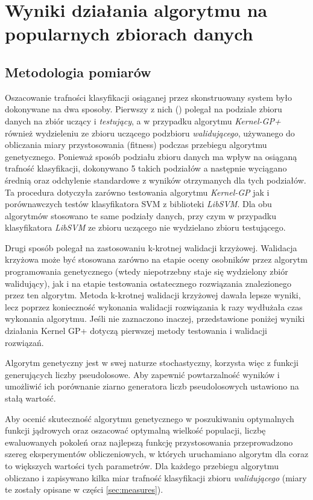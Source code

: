 
\chapter{Wyniki działania algorytmu na popularnych zbiorach danych}

\section{Metodologia pomiarów}
	Oszacowanie trafności klasyfikacji osiąganej przez skonstruowany system było dokonywane na dwa sposoby. Pierwszy z nich () polegał na podziale zbioru danych na zbiór uczący i \emph{testujący}, a w przypadku algorytmu \emph{Kernel-GP+} również wydzieleniu ze zbioru uczącego podzbioru \emph{walidującego}, używanego do obliczania miary przystosowania (fitness) podczas przebiegu algorytmu genetycznego. Ponieważ sposób podziału zbioru danych ma wpływ na osiąganą trafność klasyfikacji, dokonywano 5 takich podziałów a następnie wyciągano średnią oraz odchylenie standardowe z wyników otrzymanych dla tych podziałów. Ta procedura dotyczyła zarówno testowania algorytmu \emph{Kernel-GP} jak i porównawczych testów klasyfikatora SVM z biblioteki \emph{LibSVM}. Dla obu algorytmów stosowano te same podziały danych, przy czym w przypadku klasyfikatora \emph{LibSVM} ze zbioru uczącego nie wydzielano zbioru testującego.

	Drugi sposób polegał na zastosowaniu k-krotnej walidacji krzyżowej. Walidacja krzyżowa może być stosowana zarówno na etapie oceny osobników przez algorytm programowania genetycznego (wtedy niepotrzebny staje się wydzielony zbiór walidujący), jak i na etapie testowania ostatecznego rozwiązania znalezionego przez ten algorytm. Metoda k-krotnej walidacji krzyżowej dawała lepsze wyniki, lecz poprzez konieczność wykonania walidacji rozwiązania k razy wydłużała czas wykonania algorytmu. Jeśli nie zaznaczono inaczej, przedstawione poniżej wyniki działania Kernel GP+ dotyczą pierwszej metody testowania i walidacji rozwiązań.
	
	Algorytm genetyczny jest w swej naturze stochastyczny, korzysta więc z funkcji generujących liczby pseudolosowe. Aby zapewnić powtarzalność wyników i umożliwić ich porównanie ziarno generatora liczb pseudolosowych ustawiono na stałą wartość.

	Aby ocenić skuteczność algorytmu genetycznego w poszukiwaniu optymalnych funkcji jądrowych oraz oszacować optymalną wielkość populacji, liczbę ewaluowanych pokoleń oraz najlepszą funkcję przystosowania przeprowadzono szereg eksperymentów obliczeniowych, w których uruchamiano algorytm dla coraz to większych wartości tych parametrów. Dla każdego przebiegu algorytmu obliczano i zapisywano kilka miar trafność klasyfikacji zbioru \emph{walidującego} (miary te zostały opisane w części \ref{sec:measures}).

